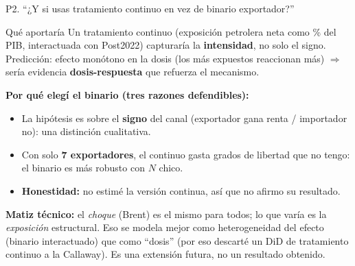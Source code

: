 \documentclass[aspectratio=169,10pt]{beamer}
\newcommand{\key}[1]{{\bfseries\color{AcentoRojo}#1}}
\begin{document}
\begin{frame}{P2. ``¿Y si usas tratamiento continuo en vez de binario exportador?''}
  \small
  \begin{block}{Qué aportaría}
    Un tratamiento continuo (exposición petrolera neta como \% del PIB, interactuada con Post2022)
    capturaría la \textbf{intensidad}, no solo el signo. Predicción: efecto monótono en la dosis
    (los más expuestos reaccionan más) $\Rightarrow$ sería evidencia \textbf{dosis-respuesta} que
    refuerza el mecanismo.
  \end{block}
  \textbf{Por qué elegí el binario (tres razones defendibles):}
  \begin{itemize}
    \item La hipótesis es sobre el \textbf{signo} del canal (exportador gana renta / importador no):
          una distinción cualitativa.
    \item Con solo \key{7 exportadores}, el continuo gasta grados de libertad que no tengo: el
          binario es más robusto con $N$ chico.
    \item \textbf{Honestidad:} no estimé la versión continua, así que no afirmo su resultado.
  \end{itemize}
  \textbf{Matiz técnico:} el \emph{choque} (Brent) es el mismo para todos; lo que varía es la
  \emph{exposición} estructural. Eso se modela mejor como heterogeneidad del efecto (binario
  interactuado) que como ``dosis'' (por eso descarté un DiD de tratamiento continuo a la Callaway).
  \alert{Es una extensión futura, no un resultado obtenido.}

\end{frame}
\end{document}
